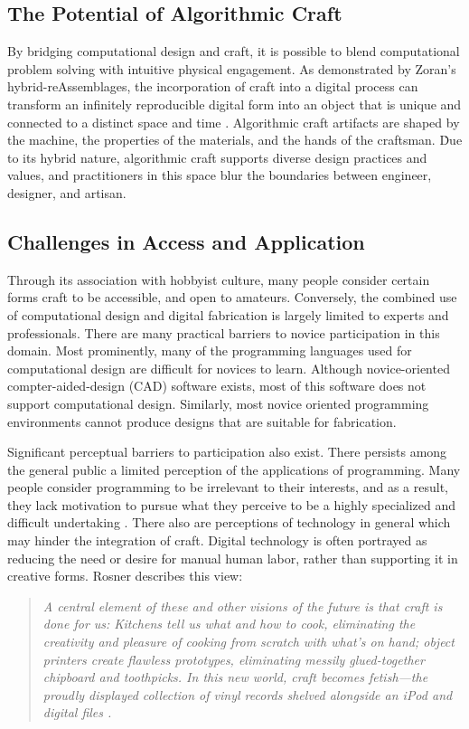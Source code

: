 \documentclass{sigchi}
\begin{document}
\subsection{The Potential of Algorithmic Craft}
By bridging computational design and craft, it is possible to blend computational problem solving with intuitive physical engagement. As demonstrated by Zoran's hybrid-reAssemblages, the incorporation of craft into a digital process can transform an infinitely reproducible digital form into an object that is unique and connected to a distinct space and time \cite{zoran}. Algorithmic craft artifacts are shaped by the machine, the properties of the materials, and the hands of the craftsman. \. Due to its hybrid nature, algorithmic craft supports diverse design practices and values, and practitioners in this space blur the boundaries between engineer, designer, and artisan.

\subsection{Challenges in Access and Application}
Through its association with hobbyist culture, many people consider certain forms craft to be accessible, and open to amateurs. Conversely, the combined use of computational design and digital fabrication is largely limited to experts and professionals. There are many practical barriers to novice participation in this domain. Most prominently, many of the programming languages used for computational design are difficult for novices to learn. Although novice-oriented compter-aided-design (CAD) software exists, most of this software does not support computational design. Similarly, most novice oriented programming environments cannot produce designs that are suitable for fabrication. 

Significant perceptual barriers to participation also exist. There persists among the general public a limited perception of the applications of programming. Many people consider programming to be irrelevant to their interests, and as a result, they lack motivation to pursue what they perceive to be a highly specialized and difficult undertaking \cite{resnick1}. There also are perceptions of technology in general which may hinder the integration of craft. Digital technology is often portrayed as reducing the need or desire for manual human labor, rather than supporting it in creative forms. Rosner describes this view:

\begin{quotation}
 \textit{A central element of these and other visions of the future is that craft is done for us: Kitchens tell us what and how to cook, eliminating the creativity and pleasure of cooking from scratch with what's on hand; object printers create flawless prototypes, eliminating messily glued-together chipboard and toothpicks. In this new world, craft becomes fetish---the proudly displayed collection of vinyl records shelved alongside an iPod and digital files \cite{rosner_craft_vs_design}.}
\end{quotation}
\end{document}
